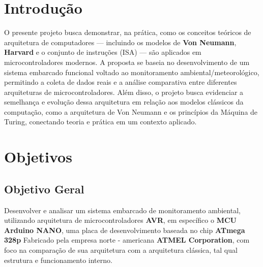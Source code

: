 \documentclass[a4paper,12pt]{article}
\begin{document}
\tableofcontents
\newpage

\section{Introdução}
O presente projeto busca demonstrar, na prática, como os conceitos teóricos de arquitetura de computadores — incluindo os modelos de \textbf{Von
Neumann}, \textbf{Harvard} e o conjunto de instruções (ISA) — são aplicados em microcontroladores modernos.
A proposta se baseia no desenvolvimento de um sistema embarcado funcional voltado ao monitoramento ambiental/meteorológico, permitindo a coleta
de dados reais e a análise comparativa entre diferentes arquiteturas de microcontroladores.
Além disso, o projeto busca evidenciar a semelhança e evolução dessa
arquitetura em relação aos modelos clássicos da computação, como a arquitetura de Von Neumann e os princípios da Máquina de Turing, conectando teoria
e prática em um contexto aplicado.

\section{Objetivos}

\subsection{Objetivo Geral}
Desenvolver e analisar um sistema embarcado de monitoramento ambiental, utilizando arquitetura de microcontroladores \textbf{AVR}, em específico o \textbf{MCU} \textbf{Arduino NANO}, uma placa de desenvolvimento baseada no chip \textbf{ATmega 328p} Fabricado pela empresa norte - americana \textbf{ATMEL Corporation}, com foco na comparação de sua arquitetura com a arquitetura clássica, tal qual estrutura e funcionamento interno.
\end{document}

